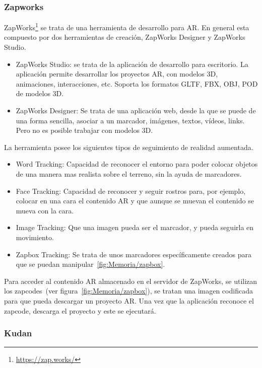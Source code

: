 \subsubsection{Zapworks} ZapWorks\footnote{\url{https://zap.works/}} se trata de una herramienta de desarrollo para AR. En general esta compuesto por dos herramientas de creación, ZapWorks Designer y ZapWorks Studio.

\begin{itemize}
	\item ZapWorks Studio: se trata de la aplicación de desarrollo para escritorio. La aplicación permite desarrollar los proyectos AR, con modelos 3D, animaciones, interacciones, etc. Soporta los formatos  GLTF, FBX, OBJ, POD de modelos 3D.
	\item ZapWorks Designer: Se trata de una aplicación web, desde la que se puede de una forma sencilla, asociar a un marcador, imágenes, textos, vídeos, links. Pero no es posible trabajar con modelos 3D.
\end{itemize}	


La herramienta posee los siguientes tipos de seguimiento de realidad aumentada.

\begin{itemize}
	\item Word Tracking: Capacidad de reconocer el entorno para poder colocar objetos de una manera mas realista sobre el terreno, sin la ayuda de marcadores.
	\item Face Tracking: Capacidad de reconocer y seguir rostros para, por ejemplo, colocar en una cara el contenido AR y que aunque se muevan el contenido se mueva con la cara.
	\item Image Tracking: Que una imagen pueda ser el marcador, y pueda seguirla en movimiento.
	\item Zapbox Tracking: Se trata de unos marcadores específicamente creados para que se puedan manipular~\ref{fig:Memoria/zapbox}.
\end{itemize}


Para acceder al contenido AR almacenado en el servidor de ZapWorks, se utilizan los zapcodes~(ver figura~\ref{fig:Memoria/zapbox}), se tratan una imagen codificada para que pueda descargar un proyecto AR. Una vez que la aplicación reconoce el zapcode, descarga el proyecto y este se ejecutará.




\subsubsection{Kudan} 

